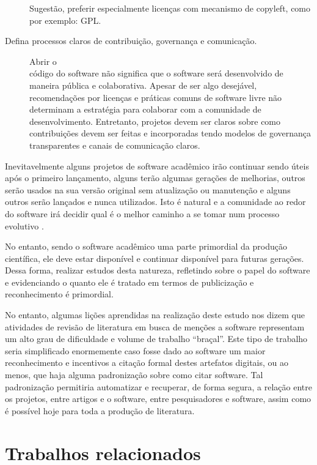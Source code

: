 \begin{description}
    Sugestão, preferir especialmente licenças com mecanismo de copyleft, como
    por exemplo: GPL.

  \item [Defina processos claros de contribuição, governança e comunicação.]

    Abrir o \\ código do software não significa que o software será desenvolvido
    de maneira pública e colaborativa. Apesar de ser algo desejável,
    recomendações por licenças e práticas comuns de software livre não
    determinam a estratégia para colaborar com a comunidade de desenvolvimento.
    Entretanto, projetos devem ser claros sobre como contribuições devem ser
    feitas e incorporadas tendo modelos de governança transparentes e canais de
    comunicação claros.

\end{description}

Inevitavelmente alguns projetos de software acadêmico irão continuar sendo
úteis após o primeiro lançamento, alguns terão algumas gerações de melhorias,
outros serão usados na sua versão original sem atualização ou manutenção e
alguns outros serão lançados e nunca utilizados. Isto é natural e 
a comunidade ao redor do software irá decidir qual é o melhor caminho a se
tomar num processo evolutivo \cite{weiner2009astronomical}.

No entanto, sendo o software acadêmico uma parte primordial da produção
científica, ele deve estar disponível e continuar disponível para futuras
gerações. Dessa forma, realizar estudos desta natureza, refletindo sobre
o papel do software e evidenciando o quanto ele é tratado em termos
de publicização e reconhecimento é primordial.

No entanto, algumas lições aprendidas na realização deste estudo nos dizem que
atividades de revisão de literatura em busca de menções a software representam
um alto grau de dificuldade e volume de trabalho ``braçal''. Este tipo de trabalho seria
simplificado enormemente caso fosse dado ao software um maior reconhecimento e
incentivos a citação formal destes artefatos digitais, ou ao menos, que haja
alguma padronização sobre como citar software. Tal padronização permitiria automatizar e
recuperar, de forma segura, a relação entre os projetos, entre artigos e o
software, entre pesquisadores e software, assim como é possível hoje para toda
a produção de literatura.

\section{Trabalhos relacionados}
\label{sec:trabalhosrelacionados}

